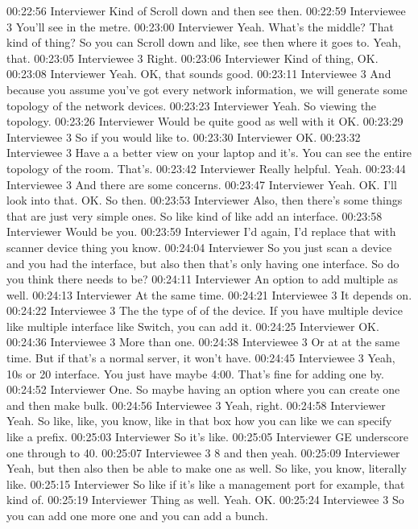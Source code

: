 00:22:56 Interviewer
Kind of Scroll down and then see then.
00:22:59 Interviewee 3
You'll see in the metre.
00:23:00 Interviewer
Yeah. What's the middle? That kind of thing? So you can Scroll down and like, see then where it goes to. Yeah, that.
00:23:05 Interviewee 3
Right.
00:23:06 Interviewer
Kind of thing, OK.
00:23:08 Interviewer
Yeah. OK, that sounds good.
00:23:11 Interviewee 3
And because you assume you've got every network information, we will generate some topology of the network devices.
00:23:23 Interviewer
Yeah. So viewing the topology.
00:23:26 Interviewer
Would be quite good as well with it OK.
00:23:29 Interviewee 3
So if you would like to.
00:23:30 Interviewer
OK.
00:23:32 Interviewee 3
Have a a better view on your laptop and it's. You can see the entire topology of the room. That's.
00:23:42 Interviewer
Really helpful. Yeah.
00:23:44 Interviewee 3
And there are some concerns.
00:23:47 Interviewer
Yeah. OK. I'll look into that. OK. So then.
00:23:53 Interviewer
Also, then there's some things that are just very simple ones. So like kind of like add an interface.
00:23:58 Interviewer
Would be you.
00:23:59 Interviewer
I'd again, I'd replace that with scanner device thing you know.
00:24:04 Interviewer
So you just scan a device and you had the interface, but also then that's only having one interface. So do you think there needs to be?
00:24:11 Interviewer
An option to add multiple as well.
00:24:13 Interviewer
At the same time.
00:24:21 Interviewee 3
It depends on.
00:24:22 Interviewee 3
The the type of of the device. If you have multiple device like multiple interface like Switch, you can add it.
00:24:25 Interviewer
OK.
00:24:36 Interviewee 3
More than one.
00:24:38 Interviewee 3
Or at at the same time. But if that's a normal server, it won't have.
00:24:45 Interviewee 3
Yeah, 10s or 20 interface. You just have maybe 4:00. That's fine for adding one by.
00:24:52 Interviewer
One. So maybe having an option where you can create one and then make bulk.
00:24:56 Interviewee 3
Yeah, right.
00:24:58 Interviewer
Yeah. So like, like, you know, like in that box how you can like we can specify like a prefix.
00:25:03 Interviewer
So it's like.
00:25:05 Interviewer
GE underscore one through to 40.
00:25:07 Interviewee 3
8 and then yeah.
00:25:09 Interviewer
Yeah, but then also then be able to make one as well. So like, you know, literally like.
00:25:15 Interviewer
So like if it's like a management port for example, that kind of.
00:25:19 Interviewer
Thing as well. Yeah. OK.
00:25:24 Interviewee 3
So you can add one more one and you can add a bunch.
